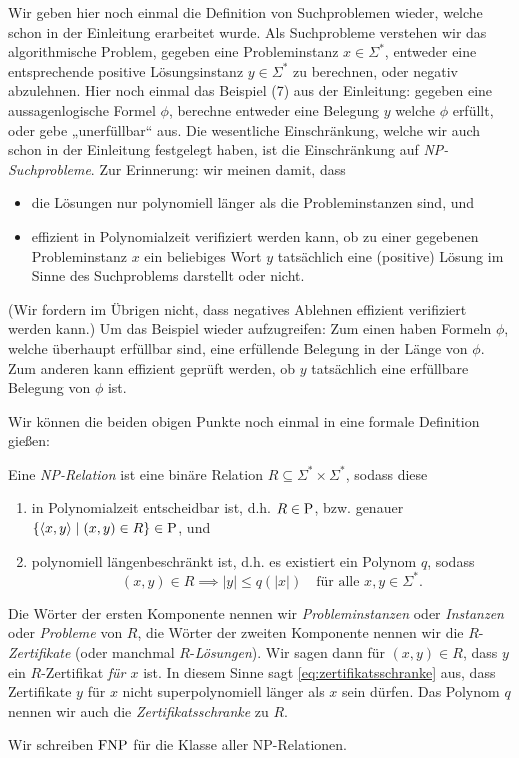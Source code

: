 Wir geben hier noch einmal die Definition von Suchproblemen wieder, welche schon in der Einleitung erarbeitet wurde.
Als Suchprobleme verstehen wir das algorithmische Problem, gegeben eine Probleminstanz $x\in\Sigma^*$, entweder eine entsprechende positive Lösungsinstanz $y\in\Sigma^*$ zu berechnen, oder negativ abzulehnen.  Hier noch einmal das Beispiel (7) aus der Einleitung: gegeben eine aussagenlogische Formel $\phi$, berechne entweder eine Belegung $y$ welche $\phi$ erfüllt, oder gebe „unerfüllbar“ aus.
Die wesentliche Einschränkung, welche wir auch schon in der Einleitung festgelegt haben, ist die Einschränkung auf \emph{NP-Suchprobleme}. Zur Erinnerung: wir meinen damit, dass
\begin{itemize}
    \item die Lösungen nur polynomiell länger als die Probleminstanzen sind, und
    \item effizient in Polynomialzeit verifiziert werden kann, ob zu einer gegebenen Probleminstanz $x$ ein beliebiges Wort $y$ tatsächlich eine (positive) Lösung im Sinne des Suchproblems darstellt oder nicht.
\end{itemize}
(Wir fordern im Übrigen nicht, dass negatives Ablehnen effizient verifiziert werden kann.)
Um das Beispiel wieder aufzugreifen: Zum einen haben Formeln $\phi$, welche überhaupt erfüllbar sind, eine erfüllende Belegung in der Länge von $\phi$. Zum anderen kann effizient geprüft werden, ob $y$ tatsächlich eine erfüllbare Belegung von $\phi$ ist.

Wir können die beiden obigen Punkte noch einmal in eine formale Definition gießen:
\begin{definition}\label{def:np-relation}
    Eine \emph{NP-Relation} ist eine binäre Relation $R\subseteq \Sigma^*\times\Sigma^*$, sodass diese
    \begin{enumerate}
        \item in Polynomialzeit entscheidbar ist, d.h. $R\in\P$, bzw. genauer $\{\langle x, y\rangle \mid (x,y)\in R\}\in\P$, und
        \item polynomiell längenbeschränkt ist, d.h. es existiert ein Polynom $q$, sodass
            \begin{equation}\label{eq:zertifikatsschranke}
                (x,y)\in R \implies |y|\leq q(|x|) \quad\text{für alle $x,y\in\Sigma^*$}.
            \end{equation}
    \end{enumerate}
    Die Wörter der ersten Komponente nennen wir \emph{Probleminstanzen} oder \emph{Instanzen} oder \emph{Probleme} von $R$, die Wörter der zweiten Komponente nennen wir die $R$-\emph{Zertifikate} (oder manchmal $R$-\emph{Lösungen}). Wir sagen dann für $(x,y)\in R$, dass $y$ ein $R$-Zertifikat \emph{für $x$} ist. In diesem Sinne sagt \eqref{eq:zertifikatsschranke}  aus, dass Zertifikate $y$ für $x$ nicht superpolynomiell länger als $x$ sein dürfen.
    Das Polynom $q$ nennen wir auch die \emph{Zertifikatsschranke} zu $R$. 

    Wir schreiben $\FNP$ für die Klasse aller NP-Relationen. \qedhere
\end{definition}

